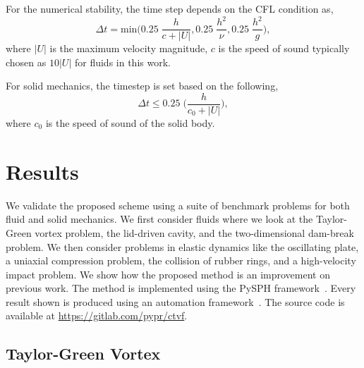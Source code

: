 For the numerical stability, the time step depends on the CFL condition as,
\begin{equation}
  \label{eq:time-step-cfl}
  \Delta t = \mathrm{min} \bigg( 0.25 \; \frac{h}{c + |U|} ,  0.25 \; \frac{h^2}{\nu},  0.25 \; \frac{h^2}{g} \bigg),
\end{equation}
where $|U|$ is the maximum velocity magnitude, $c$ is the speed of sound
typically chosen as $10 |U|$ for fluids in this work.

%
For solid mechanics, the timestep is set based on the following,
\begin{equation}
  \label{eq:time-step-body-force}
  \Delta t \leq 0.25 \; \bigg(\frac{h}{c_0 + |U|} \bigg),
\end{equation}
where $c_0$ is the speed of sound of the solid body.

\section{Results}
\label{sec:results}

We validate the proposed scheme using a suite of benchmark problems for both
fluid and solid mechanics. We first consider fluids where we look at the
Taylor-Green vortex problem, the lid-driven cavity, and the two-dimensional
dam-break problem. We then consider problems in elastic dynamics like the
oscillating plate, a uniaxial compression problem, the collision of rubber
rings, and a high-velocity impact problem. We show how the proposed method is an
improvement on previous work. The method is implemented using the PySPH
framework~\citep{PR:pysph:scipy16,pysph2020}. Every result shown is produced
using an automation framework~\citep{pr:automan:2018}. The source code is
available at \url{https://gitlab.com/pypr/ctvf}.

\FloatBarrier%

\subsection{Taylor-Green Vortex}
\label{sec:tgv}

